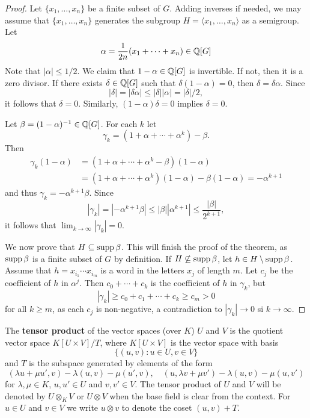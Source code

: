 \begin{proof}
	Let $\{x_1,\dots,x_n\}$ be a finite subset of $G$. Adding inverses if needed, we may assume that 
	$\{x_1,\dots,x_n\}$ generates the subgroup
	$H=\langle x_1,\dots,x_n\rangle$ as a semigroup. Let 
	\[
		\alpha=\frac{1}{2n}(x_1+\cdots+x_n)\in\mathbb{Q}[G]
	\]
    Note that $|\alpha|\leq 1/2$. 
	We claim that $1-\alpha\in\mathbb{Q}[G]$ is invertible. If not, then it is a zero divisor. If there exists 
	$\delta\in\mathbb{Q}[G]$ such that $\delta(1-\alpha)=0$, then 
	$\delta=\delta\alpha$. Since  
	\[
		|\delta|=|\delta\alpha|\leq|\delta||\alpha|=|\delta|/2,
	\]
	it follows that $\delta=0$. Similarly, $(1-\alpha)\delta=0$ implies
	$\delta=0$. 
	
	Let $\beta=(1-\alpha)^{-1}\in\mathbb{Q}[G]$.  For each $k$ let  
	\[
		\gamma_k=(1+\alpha+\cdots+\alpha^k)-\beta.
	\]
	Then 
	\begin{align*}
		\gamma_k(1-\alpha)&=(1+\alpha+\cdots+\alpha^k-\beta)(1-\alpha)\\
		&=(1+\alpha+\cdots+\alpha^k)(1-\alpha)-\beta(1-\alpha)=-\alpha^{k+1}
	\end{align*}
	and thus  
	$\gamma_k=-\alpha^{k+1}\beta$. Since  
	\[
		|\gamma_k|=|-\alpha^{k+1}\beta|\leq|\beta||\alpha^{k+1}|\leq\frac{|\beta|}{2^{k+1}},
	\]
	it follows that $\lim_{k\to\infty}|\gamma_k|=0$. 

	We now prove that $H\subseteq\operatorname{supp}\beta$. This will finish the proof of the theorem, 
	as $\operatorname{supp}\beta$ is a finite subset of $G$ by definition. If
	$H\not\subseteq\operatorname{supp}\beta$, let $h\in H\setminus\operatorname{supp}\beta$.  Assume that 
    $h=x_{i_1}\cdots x_{i_m}$ is a word in the letters $x_j$ of length $m$. Let 
    $c_j$ be the coefficient of $h$ in $\alpha^j$. Then $c_0+\cdots+c_k$ is the 
	coefficient of $h$ in $\gamma_k$, but 
	\[
		|\gamma_k|\geq c_0+c_1+\cdots+c_k\geq c_m>0
	\]
	for all $k\geq m$, as each $c_j$ is non-negative, a contradiction to 
	$|\gamma_k|\to 0$ si $k\to\infty$.
\end{proof}


The \textbf{tensor product} of the vector spaces (over $K$) $U$ and $V$ 
is the quotient vector space $K[U\times V]/T$, where $K[U\times V]$ 
is the vector space with basis 
\[
\{(u,v):u\in U,v\in V\}
\]
and $T$ is the subspace 
generated by elements of the form 
\[
		(\lambda u+\mu u',v)-\lambda(u,v)-\mu(u',v),\quad
		(u,\lambda v+\mu v')-\lambda(u,v)-\mu(u,v')
	\]
for $\lambda,\mu\in K$, $u,u'\in U$ and $v,v'\in V$.
The tensor product of $U$ and $V$ will be denoted by $U\otimes_KV$ or 
$U\otimes V$ when the base field is clear from the context. For $u\in U$ and 
$v\in V$ we write $u\otimes v$ to denote the coset $(u,v)+T$.

